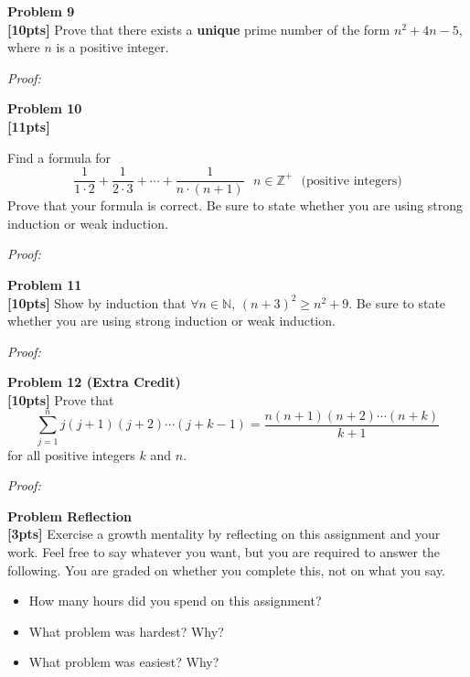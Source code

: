 \documentclass{article}
\newenvironment{problem}[2][Problem]
    { \begin{mdframed}[backgroundcolor=gray!20] \textbf{#1 #2} \\}
    {  \end{mdframed}}
\newenvironment{solution}
    {\textit{Proof:}}
    {}
\begin{document}
\begin{problem}{9}
\textbf{[10pts]} Prove that there exists a \textbf{unique} prime number of the form $n^2 + 4n - 5$, where $n$ is a positive integer.
\end{problem}

\begin{solution}
\end{solution}


\begin{problem}{10}
\textbf{[11pts]} \item Find a formula for
$$ \frac{1}{1\cdot 2} + \frac{1}{2\cdot 3} + \cdots + \frac{1}{n\cdot (n+1)}\ \ \ n\in\mathbb{Z}^+\ \ \ \text{(positive integers)}$$
Prove that your formula is correct. Be sure to state whether you are using strong induction or weak induction.
\end{problem}

\begin{solution}
\end{solution}

\begin{problem}{11}
\textbf{[10pts]} Show by induction that $\forall n\in\mathbb{N}$, $(n+3)^2\geq n^2+9$. Be sure to state whether you are using strong induction or weak induction.
\end{problem}

\begin{solution}
\end{solution}

\newpage
\begin{problem}{12 (Extra Credit)}
\textbf{[10pts]} Prove that $$\sum_{j=1}^n j(j+1)(j+2)\cdots(j+k-1)=\frac{n(n+1)(n+2)\cdots(n+k)}{k+1}$$ for all positive integers $k$ and $n$.
\end{problem}

\begin{solution}
\end{solution}

\begin{problem}{Reflection}
\textbf{[3pts]} Exercise a growth mentality by reflecting on this assignment and your work. Feel free to say whatever you want, but you are required to answer the following. You are graded on whether you complete this, not on what you say.
\begin{itemize}
\item How many hours did you spend on this assignment?
\item What problem was hardest? Why?
\item What problem was easiest? Why?
\end{itemize}
\end{problem}
\end{document}
